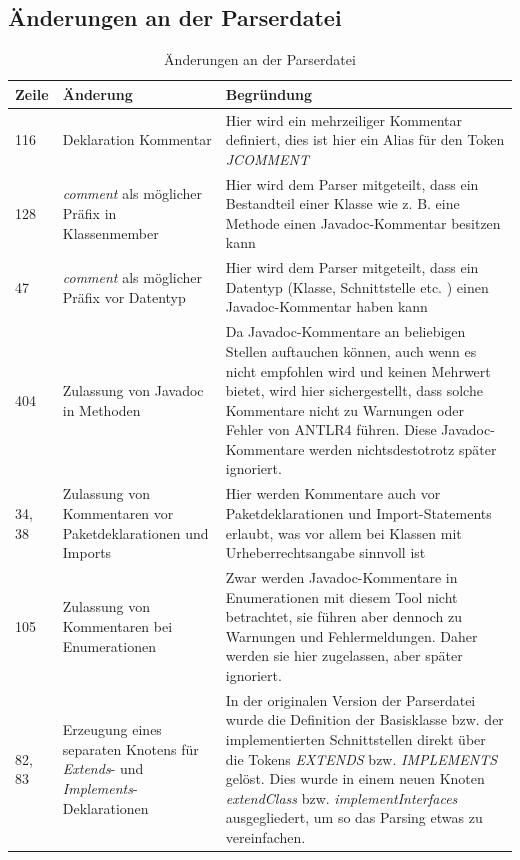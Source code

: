 
\renewcommand\appendixpagename{Anhänge}
\begin{appendices}


\chapter{Änderungen an der Parserdatei}
\begin{table}[h!]
    \centering
    \begin{tabular}{m{0.75cm}|m{4cm}|m{10cm}}
        Zeile & Änderung & Begründung \\
         \hline
        116 & Deklaration Kommentar & Hier wird ein mehrzeiliger Kommentar definiert, dies ist hier ein Alias für den Token \textit{JCOMMENT}\\
        \hline
        128 & \textit{comment} als möglicher Präfix in Klassenmember & Hier wird dem Parser mitgeteilt, dass ein Bestandteil einer Klasse wie z. B. eine Methode einen Javadoc-Kommentar besitzen kann\\
        \hline
        47 & \textit{comment} als möglicher Präfix vor Datentyp & Hier wird dem Parser mitgeteilt, dass ein Datentyp (Klasse, Schnittstelle etc. ) einen Javadoc-Kommentar haben kann \\
        \hline
        404 & Zulassung von Javadoc in Methoden & Da Javadoc-Kommentare an beliebigen Stellen auftauchen können, auch wenn es nicht empfohlen wird und keinen Mehrwert bietet, wird hier sichergestellt, dass solche Kommentare nicht zu Warnungen oder Fehler von ANTLR4 führen. Diese Javadoc-Kommentare werden nichtsdestotrotz später ignoriert.\\
        \hline
        34, 38& Zulassung von Kommentaren vor Paketdeklarationen und Imports & Hier werden Kommentare auch vor Paketdeklarationen und Import-Statements erlaubt, was vor allem bei Klassen mit Urheberrechtsangabe sinnvoll ist\\
        \hline
        105 & Zulassung von Kommentaren bei Enumerationen & Zwar werden Javadoc-Kommentare in Enumerationen mit diesem Tool nicht betrachtet, sie führen aber dennoch zu Warnungen und Fehlermeldungen. Daher werden sie hier zugelassen, aber später ignoriert. \\
        \hline
        82, 83 & Erzeugung eines separaten Knotens für \textit{Extends}- und \textit{Implements}-Deklarationen & In der originalen Version der Parserdatei wurde die Definition der Basisklasse bzw. der implementierten Schnittstellen direkt über die Tokens \textit{EXTENDS} bzw. \textit{IMPLEMENTS} gelöst. Dies wurde in einem neuen Knoten \textit{extendClass} bzw. \textit{implementInterfaces} ausgegliedert, um so das Parsing etwas zu vereinfachen.  \\
         \hline
    \end{tabular}
    \caption{Änderungen an der Parserdatei}
    \label{tab:parser_changes}
\end{table}


\end{appendices}
